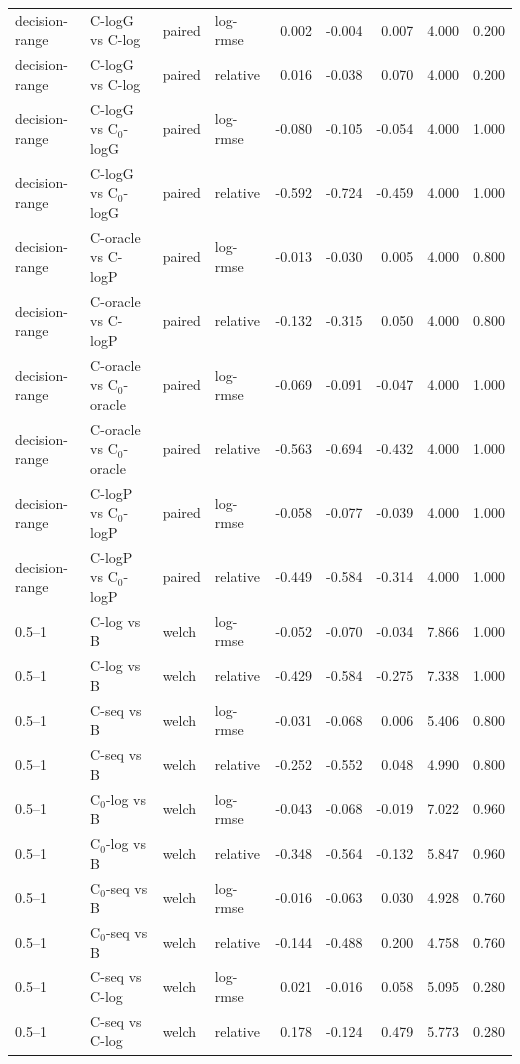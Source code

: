 \begin{longtable}{llllrrrrr}
decision-range & C-logG vs C-log & paired & log-rmse & 0.002 & -0.004 & 0.007 & 4.000 & 0.200 \\
decision-range & C-logG vs C-log & paired & relative & 0.016 & -0.038 & 0.070 & 4.000 & 0.200 \\
decision-range & C-logG vs C$_0$-logG & paired & log-rmse & -0.080 & -0.105 & -0.054 & 4.000 & 1.000 \\
decision-range & C-logG vs C$_0$-logG & paired & relative & -0.592 & -0.724 & -0.459 & 4.000 & 1.000 \\
decision-range & C-oracle vs C-logP & paired & log-rmse & -0.013 & -0.030 & 0.005 & 4.000 & 0.800 \\
decision-range & C-oracle vs C-logP & paired & relative & -0.132 & -0.315 & 0.050 & 4.000 & 0.800 \\
decision-range & C-oracle vs C$_0$-oracle & paired & log-rmse & -0.069 & -0.091 & -0.047 & 4.000 & 1.000 \\
decision-range & C-oracle vs C$_0$-oracle & paired & relative & -0.563 & -0.694 & -0.432 & 4.000 & 1.000 \\
decision-range & C-logP vs C$_0$-logP & paired & log-rmse & -0.058 & -0.077 & -0.039 & 4.000 & 1.000 \\
decision-range & C-logP vs C$_0$-logP & paired & relative & -0.449 & -0.584 & -0.314 & 4.000 & 1.000 \\
0.5–1 & C-log vs B & welch & log-rmse & -0.052 & -0.070 & -0.034 & 7.866 & 1.000 \\
0.5–1 & C-log vs B & welch & relative & -0.429 & -0.584 & -0.275 & 7.338 & 1.000 \\
0.5–1 & C-seq vs B & welch & log-rmse & -0.031 & -0.068 & 0.006 & 5.406 & 0.800 \\
0.5–1 & C-seq vs B & welch & relative & -0.252 & -0.552 & 0.048 & 4.990 & 0.800 \\
0.5–1 & C$_0$-log vs B & welch & log-rmse & -0.043 & -0.068 & -0.019 & 7.022 & 0.960 \\
0.5–1 & C$_0$-log vs B & welch & relative & -0.348 & -0.564 & -0.132 & 5.847 & 0.960 \\
0.5–1 & C$_0$-seq vs B & welch & log-rmse & -0.016 & -0.063 & 0.030 & 4.928 & 0.760 \\
0.5–1 & C$_0$-seq vs B & welch & relative & -0.144 & -0.488 & 0.200 & 4.758 & 0.760 \\
0.5–1 & C-seq vs C-log & welch & log-rmse & 0.021 & -0.016 & 0.058 & 5.095 & 0.280 \\
0.5–1 & C-seq vs C-log & welch & relative & 0.178 & -0.124 & 0.479 & 5.773 & 0.280 \\

\end{longtable}
